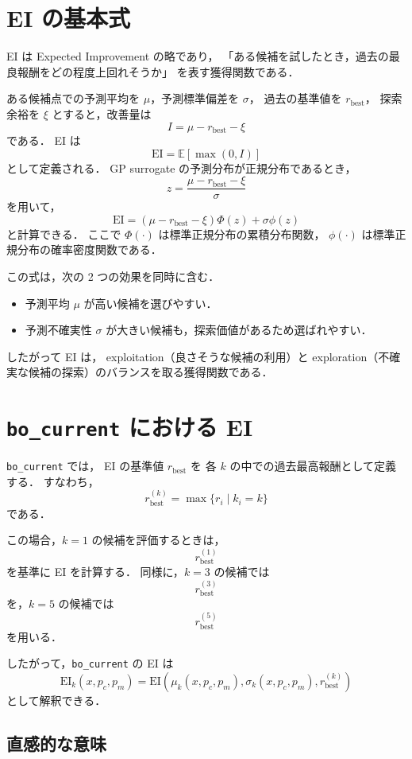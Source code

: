 \documentclass[a4paper,11pt]{ltjsarticle}
\newcommand{\EI}{\mathrm{EI}}
\begin{document}
\section{EI の基本式}

EI は Expected Improvement の略であり，
「ある候補を試したとき，過去の最良報酬をどの程度上回れそうか」
を表す獲得関数である．

ある候補点での予測平均を \(\mu\)，予測標準偏差を \(\sigma\)，
過去の基準値を \(r_{\mathrm{best}}\)，
探索余裕を \(\xi\) とすると，改善量は
\[
  I = \mu - r_{\mathrm{best}} - \xi
\]
である．
EI は
\[
  \EI = \mathbb{E}[\max(0,I)]
\]
として定義される．
GP surrogate の予測分布が正規分布であるとき，
\[
  z = \frac{\mu-r_{\mathrm{best}}-\xi}{\sigma}
\]
を用いて，
\[
  \EI
  =
  (\mu-r_{\mathrm{best}}-\xi)\Phi(z)
  +
  \sigma\phi(z)
\]
と計算できる．
ここで \(\Phi(\cdot)\) は標準正規分布の累積分布関数，
\(\phi(\cdot)\) は標準正規分布の確率密度関数である．

この式は，次の 2 つの効果を同時に含む．
\begin{itemize}
  \item 予測平均 \(\mu\) が高い候補を選びやすい．
  \item 予測不確実性 \(\sigma\) が大きい候補も，探索価値があるため選ばれやすい．
\end{itemize}

したがって EI は， exploitation（良さそうな候補の利用）と
exploration（不確実な候補の探索）のバランスを取る獲得関数である．

\section{\texttt{bo\_current} における EI}

\texttt{bo\_current} では，
EI の基準値 \(r_{\mathrm{best}}\) を
各 \(k\) の中での過去最高報酬として定義する．
すなわち，
\[
  r_{\mathrm{best}}^{(k)}
  =
  \max
  \{ r_i \mid k_i = k \}
\]
である．

この場合，\(k=1\) の候補を評価するときは，
\[
  r_{\mathrm{best}}^{(1)}
\]
を基準に EI を計算する．
同様に，\(k=3\) の候補では
\[
  r_{\mathrm{best}}^{(3)}
\]
を，\(k=5\) の候補では
\[
  r_{\mathrm{best}}^{(5)}
\]
を用いる．

したがって，\texttt{bo\_current} の EI は
\[
  \EI_k(x,p_c,p_m)
  =
  \EI
  \left(
  \mu_k(x,p_c,p_m),
  \sigma_k(x,p_c,p_m),
  r_{\mathrm{best}}^{(k)}
  \right)
\]
として解釈できる．

\subsection{直感的な意味}
\end{document}

